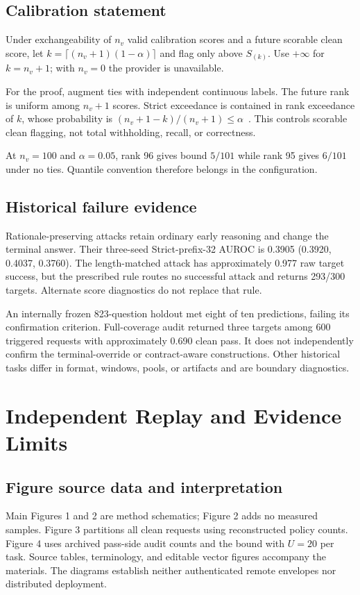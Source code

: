 \documentclass[journal,onecolumn]{IEEEtran}
\begin{document}
\subsection{Calibration statement}
Under exchangeability of $n_v$ valid calibration scores and a future scorable clean score, let $k=\lceil(n_v+1)(1-\alpha)\rceil$ and flag only above $S_{(k)}$. Use $+\infty$ for $k=n_v+1$; with $n_v=0$ the provider is unavailable.

For the proof, augment ties with independent continuous labels. The future rank is uniform among $n_v+1$ scores. Strict exceedance is contained in rank exceedance of $k$, whose probability is $(n_v+1-k)/(n_v+1)\le\alpha$~\cite{bates2023testing}. This controls scorable clean flagging, not total withholding, recall, or correctness.

At $n_v=100$ and $\alpha=0.05$, rank 96 gives bound $5/101$ while rank 95 gives $6/101$ under no ties. Quantile convention therefore belongs in the configuration.

\subsection{Historical failure evidence}
Rationale-preserving attacks retain ordinary early reasoning and change the terminal answer. Their three-seed Strict-prefix-32 AUROC is 0.3905 (0.3920, 0.4037, 0.3760). The length-matched attack has approximately 0.977 raw target success, but the prescribed rule routes no successful attack and returns 293/300 targets. Alternate score diagnostics do not replace that rule.

An internally frozen 823-question holdout met eight of ten predictions, failing its confirmation criterion. Full-coverage audit returned three targets among 600 triggered requests with approximately 0.690 clean pass. It does not independently confirm the terminal-override or contract-aware constructions. Other historical tasks differ in format, windows, pools, or artifacts and are boundary diagnostics.


\section{Independent Replay and Evidence Limits}
\label{sec:s11}
\subsection{Figure source data and interpretation}
Main Figures 1 and 2 are method schematics; Figure 2 adds no measured samples. Figure 3 partitions all clean requests using reconstructed policy counts. Figure 4 uses archived pass-side audit counts and the bound with $U=20$ per task. Source tables, terminology, and editable vector figures accompany the materials. The diagrams establish neither authenticated remote envelopes nor distributed deployment.
\end{document}
